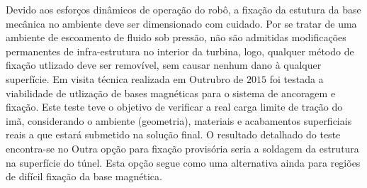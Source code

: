   Devido aos esforços dinâmicos de operação do robô, a fixação da estutura da
  base mecânica no ambiente deve ser dimensionado com cuidado. Por se
  tratar de uma ambiente de escoamento de fluido sob pressão, não são admitidas
  modificações permanentes de infra-estrutura no interior da turbina, logo,
  qualquer método de fixação utlizado deve ser removível, sem causar nenhum dano
  à qualquer superfície. Em visita técnica realizada em Outrubro de $2015$ foi
  testada a viabilidade de utlização de bases magnéticas para o sistema de
  ancoragem e fixação. Este teste teve o objetivo de verificar a real carga limite de tração
  do imã, considerando o ambiente (geometria), materiais e acabamentos
  superficiais reais a que estará submetido na solução final. O resultado
  detalhado do teste encontra-se no
  Outra opção para fixação provisória seria a soldagem da estrutura na
  superfície do túnel. Esta opção segue como uma alternativa ainda para regiões
  de difícil fixação da base magnética.
  
  
